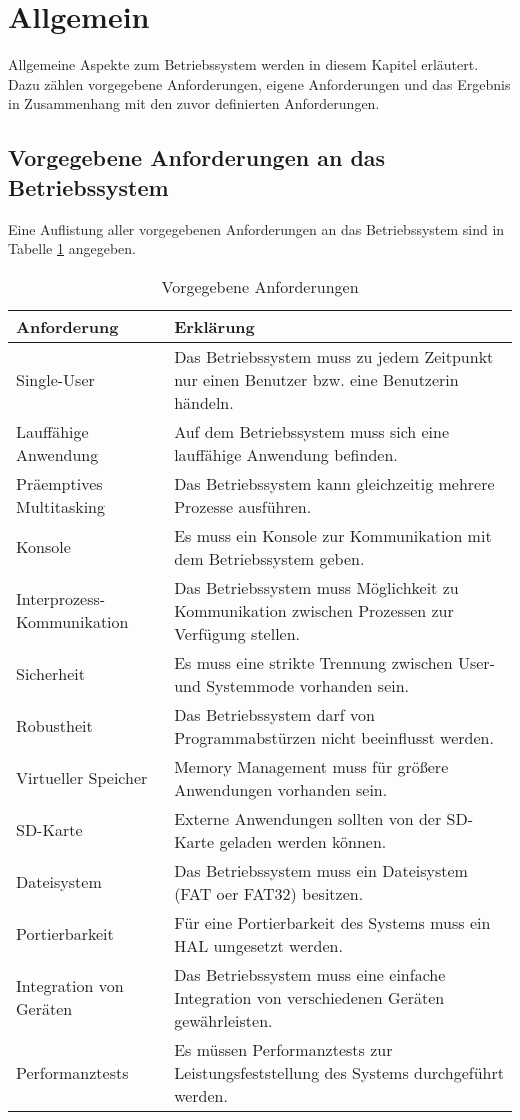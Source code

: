 \section{Allgemein}
Allgemeine Aspekte zum Betriebssystem werden in diesem Kapitel erläutert. Dazu zählen vorgegebene Anforderungen, eigene Anforderungen und das Ergebnis in Zusammenhang mit den zuvor definierten Anforderungen.

\subsection{Vorgegebene Anforderungen an das Betriebssystem}
Eine Auflistung aller vorgegebenen Anforderungen an das Betriebssystem sind in Tabelle \ref{table:Prescribed-Requirements} angegeben.

\begin{table}[H]
\begin{tabular}{ p{5cm}| p{9cm} }
  \textbf{Anforderung} & \textbf{Erklärung} \\ 
  \hline
  Single-User & Das Betriebssystem muss zu jedem Zeitpunkt nur einen Benutzer bzw. eine Benutzerin händeln. \\
  Lauffähige Anwendung & Auf dem Betriebssystem muss sich eine lauffähige Anwendung befinden. \\
  Präemptives Multitasking & Das Betriebssystem kann gleichzeitig mehrere Prozesse ausführen.\\
  Konsole & Es muss ein Konsole zur Kommunikation mit dem Betriebssystem geben. \\
  Interprozess-Kommunikation & Das Betriebssystem muss Möglichkeit zu Kommunikation zwischen Prozessen zur Verfügung stellen. \\
  Sicherheit & Es muss eine strikte Trennung zwischen User- und Systemmode vorhanden sein. \\
  Robustheit & Das Betriebssystem darf von Programmabstürzen nicht beeinflusst werden. \\
  Virtueller Speicher & Memory Management muss für größere Anwendungen vorhanden sein. \\
  SD-Karte & Externe Anwendungen sollten von der SD-Karte geladen werden können. \\
  Dateisystem & Das Betriebssystem muss ein Dateisystem (FAT oer FAT32) besitzen. \\
  Portierbarkeit & Für eine Portierbarkeit des Systems muss ein HAL umgesetzt werden. \\
  Integration von Geräten & Das Betriebssystem muss eine einfache Integration von verschiedenen Geräten gewährleisten. \\
  Performanztests & Es müssen Performanztests zur Leistungsfeststellung des Systems durchgeführt werden. \\  
 \end{tabular}
 \caption{Vorgegebene Anforderungen}
 \label{table:Prescribed-Requirements}
\end{table}

